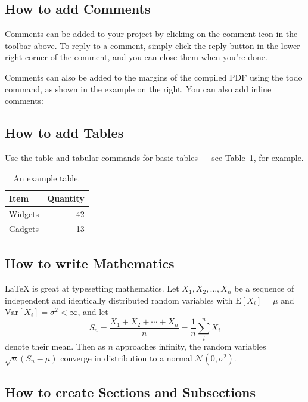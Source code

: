 \documentclass[a4paper]{article}
\begin{document}
\subsection{How to add Comments}

Comments can be added to your project by clicking on the comment icon in the toolbar above. %
%
%
To reply to a comment, simply click the reply button in the lower right corner of the comment, and you can close them when you're done.

Comments can also be added to the margins of the compiled PDF using the todo command, as shown in the example on the right. You can also add inline comments:



\subsection{How to add Tables}

Use the table and tabular commands for basic tables --- see Table~\ref{tab:widgets}, for example.

\begin{table}
\centering
\begin{tabular}{l|r}
Item & Quantity \\\hline
Widgets & 42 \\
Gadgets & 13
\end{tabular}
\caption{\label{tab:widgets}An example table.}
\end{table}

\subsection{How to write Mathematics}

\LaTeX{} is great at typesetting mathematics. Let $X_1, X_2, \ldots, X_n$ be a sequence of independent and identically distributed random variables with $\text{E}[X_i] = \mu$ and $\text{Var}[X_i] = \sigma^2 < \infty$, and let
\[S_n = \frac{X_1 + X_2 + \cdots + X_n}{n}
      = \frac{1}{n}\sum_{i}^{n} X_i\]
denote their mean. Then as $n$ approaches infinity, the random variables $\sqrt{n}(S_n - \mu)$ converge in distribution to a normal $\mathcal{N}(0, \sigma^2)$.


\subsection{How to create Sections and Subsections}
\end{document}
